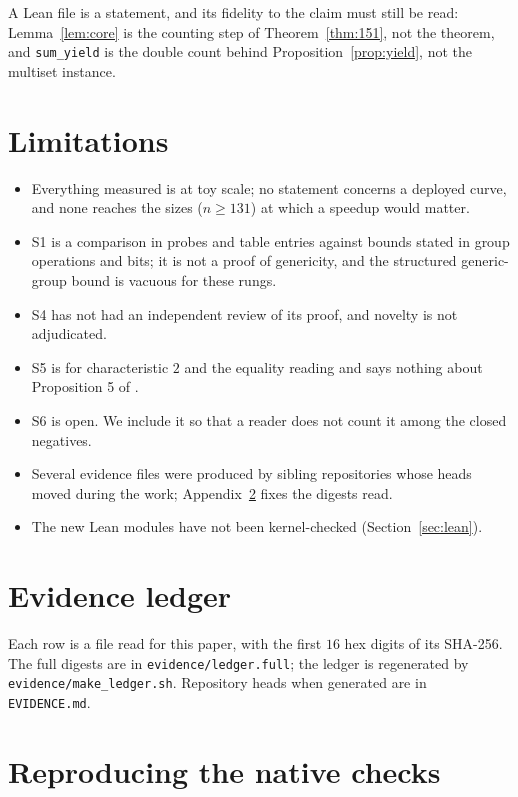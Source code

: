 \documentclass[10pt,a4paper]{article}
\theoremstyle{definition}
\theoremstyle{remark}
\begin{document}
A Lean file is a statement, and its fidelity to the claim must still be read:
Lemma~\ref{lem:core} is the counting step of Theorem~\ref{thm:151}, not the theorem,
and \texttt{sum\_yield} is the double count behind Proposition~\ref{prop:yield}, not
the multiset instance.

\section{Limitations}
\label{sec:limits}

\begin{itemize}
\item Everything measured is at toy scale; no statement concerns a deployed curve,
  and none reaches the sizes ($n\ge131$) at which a speedup would matter.
\item S1 is a comparison in probes and table entries against bounds stated in
  group operations and bits; it is not a proof of genericity, and the structured
  generic-group bound is vacuous for these rungs.
\item S4 has not had an independent review of its proof, and novelty is not adjudicated.
\item S5 is for characteristic $2$ and the equality reading and says nothing about
  Proposition 5 of \cite{Nag15}.
\item S6 is open. We include it so that a reader does not count it among the
  closed negatives.
\item Several evidence files were produced by sibling repositories whose heads moved
  during the work; Appendix~\ref{app:ledger} fixes the digests read.
\item The new Lean modules have not been kernel-checked (Section~\ref{sec:lean}).
\end{itemize}

\appendix
\section{Evidence ledger}
\label{app:ledger}

Each row is a file read for this paper, with the first $16$ hex digits of its SHA-256.
The full digests are in \texttt{evidence/ledger.full}; the ledger is regenerated by
\texttt{evidence/make\_ledger.sh}. Repository heads when generated are in
\texttt{EVIDENCE.md}.

{\footnotesize

}

\section{Reproducing the native checks}
\label{app:repro}
\end{document}
